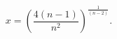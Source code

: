 \begin{equation}
x = \left ({\frac
{4(n-1)}{{n}^{2}}}\right )^\frac{1}{\left (n-2\right )}. \label{subs}
\end{equation}

